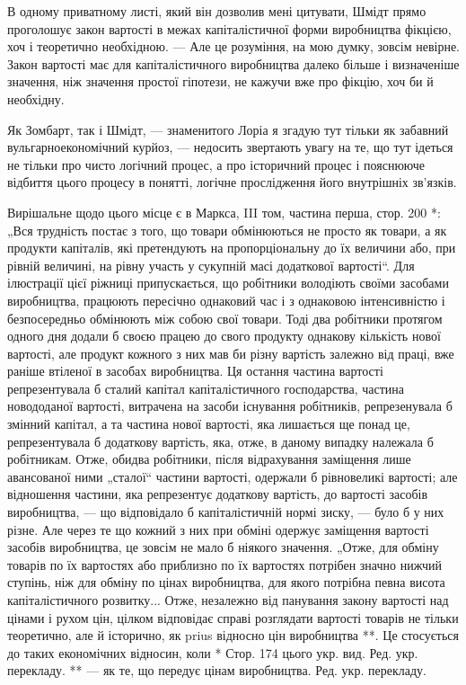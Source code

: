 \parcont{}  %
В одному приватному листі, який він дозволив мені цитувати, Шмідт прямо проголошує закон вартості в межах капіталістичної форми
виробництва фікцією, хоч і теоретично необхідною. — Але це розуміння, на мою думку, зовсім невірне. Закон вартості має для
капіталістичного виробництва далеко більше і визначеніше значення, ніж значення простої гіпотези, не кажучи вже про фікцію,
хоч би й необхідну.

Як Зомбарт, так і Шмідт, — знаменитого Лоріа я згадую тут тільки як забавний вульгарноекономічний
курйоз, — недосить звертають увагу на те, що тут ідеться не тільки про чисто логічний процес, а про історичний процес і
пояснююче відбиття цього процесу в понятті, логічне прослідження його внутрішніх зв’язків.

Вирішальне щодо цього місце є в
Маркса, III том, частина перша, стор. 200 *: „Вся трудність постає з того, що товари обмінюються не просто як товари, а як
продукти капіталів, які претендують на пропорціональну до їх величини або, при рівній величині, на рівну участь у сукупній
масі додаткової вартості“.  Для ілюстрації цієї ріжниці припускається, що робітники володіють своїми засобами виробництва,
працюють пересічно однаковий час і з однаковою інтенсивністю і безпосередньо обмінюють між собою свої товари. Тоді два
робітники протягом одного дня додали б своєю працею до свого продукту однакову кількість нової вартості, але продукт кожного
з них мав би різну вартість залежно від праці, вже раніше втіленої в засобах виробництва. Ця остання частина вартості
репрезентувала б сталий капітал капіталістичного господарства, частина новододаної вартості, витрачена на засоби існування
робітників, репрезенувала б змінний капітал, а та частина нової вартості, яка лишається ще понад це, репрезентувала б
додаткову вартість, яка, отже, в даному випадку належала б робітникам. Отже, обидва робітники, після відрахування заміщення
лише авансованої ними „сталої“ частини вартості, одержали б рівновеликі вартості; але відношення частини, яка репрезентує
додаткову вартість, до
вартості засобів виробництва, — що відповідало б капіталістичній нормі зиску, — було б у них різне. Але через те що кожний з них
при обміні одержує заміщення вартості засобів виробництва, це зовсім не мало б ніякого значення. „Отже, для обміну
товарів по їх вартостях або приблизно по їх вартостях потрібен значно нижчий ступінь, ніж для обміну по цінах виробництва,
для якого потрібна певна висота капіталістичного розвитку... Отже, незалежно від панування закону вартості над цінами і
рухом цін, цілком відповідає справі розглядати вартості товарів не тільки теоретично, але й історично, як prius відносно цін
виробництва **. Це стосується до таких економічних відносин, коли
* Стор. 174 цього укр. вид. Ред. укр. перекладу. ** — як те, що передує цінам виробництва. Ред. укр. перекладу.
\parbreak{}  %
